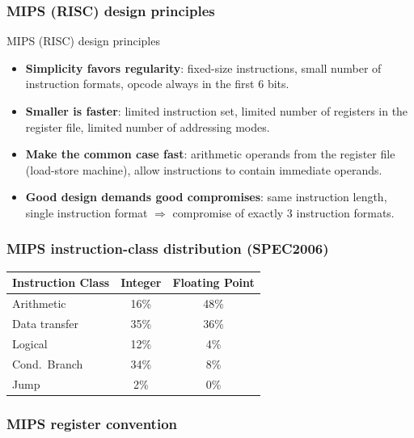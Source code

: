 \subsubsection{MIPS (RISC) design principles}

\begin{noot}{MIPS (RISC) design principles}
\begin{itemize}
  \item \textbf{Simplicity favors regularity}: fixed-size instructions,
  small number of instruction formats, opcode always in the first 6 bits.
  \item \textbf{Smaller is faster}: limited instruction set, limited number
  of registers in the register file, limited number of addressing modes.
  \item \textbf{Make the common case fast}: arithmetic operands from the
  register file (load-store machine), allow instructions to contain
  immediate operands.
  \item \textbf{Good design demands good compromises}: same instruction
  length, single instruction format $\Rightarrow$ compromise of exactly 3
  instruction formats.
\end{itemize}
\end{noot}

\subsubsection{MIPS instruction-class distribution (SPEC2006)}

\begin{center}
\begin{tabular}{@{}lcc@{}}
\toprule
Instruction Class & Integer & Floating Point \\
\midrule
Arithmetic    & 16\% & 48\% \\
Data transfer & 35\% & 36\% \\
Logical       & 12\% & 4\%  \\
Cond.\ Branch & 34\% & 8\%  \\
Jump          & 2\%  & 0\%  \\
\bottomrule
\end{tabular}
\end{center}

\subsubsection{MIPS register convention}

